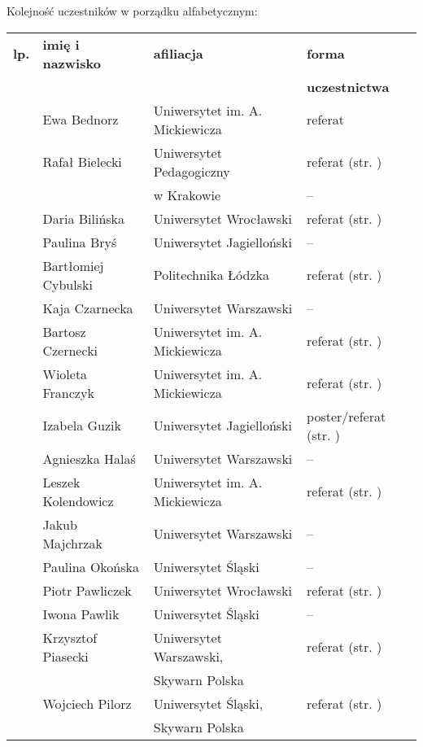 \documentclass[12pt,oneside]{book}
\begin{document}
Kolejność uczestników w porządku alfabetycznym:


\normalsize
\begin{tabular}{||c|l|l|l||}
\hline
\hline
\textbf{lp.} & \textbf{imię i nazwisko} & \textbf{afiliacja} & \textbf{forma}\\
 &  &  & \textbf{uczestnictwa}\\
\hline
\hline
\hline
	 & Ewa Bednorz & Uniwersytet im. A. Mickiewicza & referat \\\hline
	 & Rafał Bielecki & Uniwersytet Pedagogiczny & referat (str. \pageref{bielecki})\\
	 &  & w Krakowie & -- \\\hline
	 & Daria Bilińska & Uniwersytet Wrocławski & referat (str. \pageref{bilinska}) \\\hline
	 & Paulina Bryś & Uniwersytet Jagielloński & -- \\\hline
	 & Bartłomiej Cybulski & Politechnika Łódzka & referat (str. \pageref{cybulski}) \\\hline
	 & Kaja Czarnecka & Uniwersytet Warszawski & -- \\\hline
	 & Bartosz Czernecki & Uniwersytet im. A. Mickiewicza & referat (str. \pageref{kolendowicz}) \\\hline
	 & Wioleta Franczyk & Uniwersytet im. A. Mickiewicza & referat  (str. \pageref{franczyk})\\\hline
 	 & Izabela Guzik & Uniwersytet Jagielloński & poster/referat (str. \pageref{guzik})\\\hline	
 	 & Agnieszka Halaś & Uniwersytet Warszawski & -- \\\hline	
 	 & Leszek Kolendowicz & Uniwersytet im. A. Mickiewicza & referat (str. \pageref{kolendowicz}) \\\hline
 	 & Jakub Majchrzak & Uniwersytet Warszawski & -- \\\hline	
	 & Paulina Okońska & Uniwersytet Śląski & -- \\\hline
 	 & Piotr Pawliczek & Uniwersytet Wrocławski & referat (str. \pageref{pawliczek})\\\hline
 	 & Iwona Pawlik & Uniwersytet Śląski & -- \\\hline
 	 & Krzysztof Piasecki & Uniwersytet Warszawski, & referat (str. \pageref{piasecki})\\
		 &  & Skywarn Polska &  \\\hline
	 & Wojciech Pilorz & Uniwersytet Śląski, & referat (str. \pageref{piasecki})\\
	 &  & Skywarn Polska &  \\\hline

\end{tabular}
\end{document}
